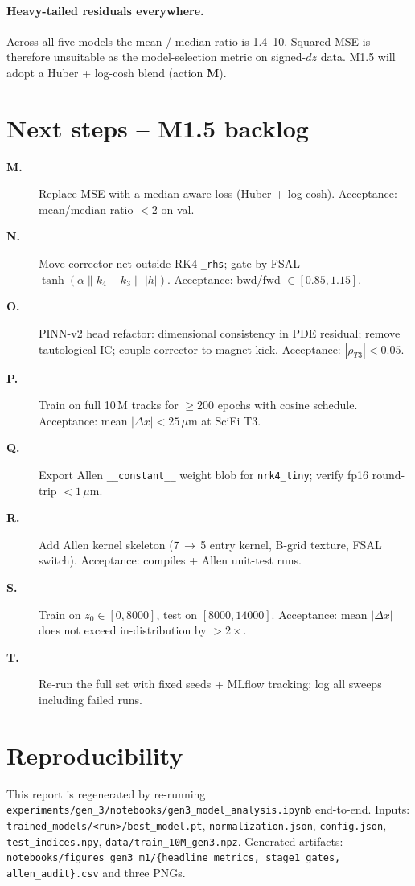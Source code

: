 \documentclass[11pt,a4paper]{article}
\begin{document}
\paragraph{Heavy-tailed residuals everywhere.}
Across all five models the mean / median ratio is 1.4--10. Squared-MSE is
therefore unsuitable as the model-selection metric on signed-$dz$ data.
M1.5 will adopt a Huber + log-cosh blend (action \textbf{M}).

\section{Next steps -- M1.5 backlog}
\begin{description}
\item[\textbf{M.}] Replace MSE with a median-aware loss
(Huber + log-cosh). Acceptance: mean/median ratio $<2$ on val.
\item[\textbf{N.}] Move corrector net outside RK4 \texttt{\_rhs}; gate by
FSAL $\tanh(\alpha\|k_4-k_3\|\,|h|)$. Acceptance: bwd/fwd $\in[0.85,1.15]$.
\item[\textbf{O.}] PINN-v2 head refactor: dimensional consistency in PDE
residual; remove tautological IC; couple corrector to magnet kick.
Acceptance: $|\rho_{T3}|<0.05$.
\item[\textbf{P.}] Train on full 10\,M tracks for $\ge200$ epochs with cosine
schedule. Acceptance: mean $|\Delta x|<25\,\mu$m at SciFi T3.
\item[\textbf{Q.}] Export Allen \texttt{\_\_constant\_\_} weight blob for
\texttt{nrk4\_tiny}; verify fp16 round-trip $<1\,\mu$m.
\item[\textbf{R.}] Add Allen kernel skeleton (7\,$\to$\,5 entry kernel,
B-grid texture, FSAL switch). Acceptance: compiles + Allen unit-test runs.
\item[\textbf{S.}] Train on $z_0\in[0,8000]$, test on $[8000,14000]$.
Acceptance: mean $|\Delta x|$ does not exceed in-distribution by $>2\times$.
\item[\textbf{T.}] Re-run the full set with fixed seeds + MLflow tracking;
log all sweeps including failed runs.
\end{description}

\section*{Reproducibility}
This report is regenerated by re-running
\texttt{experiments/gen\_3/notebooks/gen3\_model\_analysis.ipynb} end-to-end.
Inputs: \texttt{trained\_models/<run>/best\_model.pt},
\texttt{normalization.json}, \texttt{config.json},
\texttt{test\_indices.npy}, \texttt{data/train\_10M\_gen3.npz}. Generated
artifacts: \texttt{notebooks/figures\_gen3\_m1/\{headline\_metrics,
stage1\_gates, allen\_audit\}.csv} and three PNGs.
\end{document}
